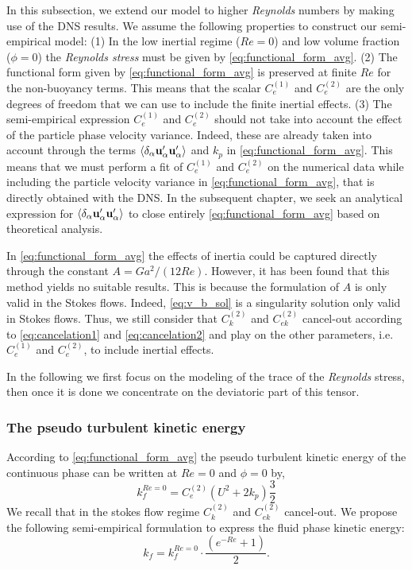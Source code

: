 In this subsection, we extend our model to higher \textit{Reynolds} numbers by making use of the DNS results. 
We assume the following properties to construct our semi-empirical model: 
(1) In the low inertial regime ($Re=0$) and low volume fraction ($\phi=0$) the \textit{Reynolds stress} must be given by  \ref{eq:functional_form_avg}. 
(2) The functional form given by \ref{eq:functional_form_avg} is preserved at finite $Re$ for the non-buoyancy terms. 
This means that the scalar $C_e^{(1)}$ and $C_e^{(2)}$ are the only degrees of freedom that we can use to include the finite inertial effects. 
(3) The semi-empirical expression  $C_e^{(1)}$ and $C_e^{(2)}$ should not take into account the effect of the particle phase velocity variance. 
Indeed, these are already taken into account through the terms $\left<\delta_\alpha \textbf{u}_\alpha'\textbf{u}_\alpha'\right>$ and $k_p$ in \ref{eq:functional_form_avg}. 
This means that we must perform a fit of $C_e^{(1)}$ and $C_e^{(2)}$ on the numerical data while including the particle velocity variance in \ref{eq:functional_form_avg}, that is directly obtained with the DNS.
In the subsequent chapter, we seek an analytical expression for $\left<\delta_\alpha \textbf{u}_\alpha'\textbf{u}_\alpha'\right>$ to close entirely \ref{eq:functional_form_avg} based on theoretical analysis.

In \ref{eq:functional_form_avg} the effects of inertia could be captured directly through the constant $A = Ga^2 /(12 Re)$. 
However, it has been found that this method yields no suitable results. 
This is because the formulation of $A$ is only valid in the Stokes flows. 
Indeed, \ref{eq:v_b_sol} is a singularity solution only valid in Stokes flows. 
Thus, we still consider that $C_k^{(2)}$ and $C_{ek}^{(2)}$ cancel-out according to \ref{eq:cancelation1} and \ref{eq:cancelation2} and play on the other parameters, i.e. $C_e^{(1)}$ and $C_e^{(2)}$,  to include inertial effects. 

In the following we first focus on the modeling of the trace of the \textit{Reynolds} stress, then once it is done we concentrate on the deviatoric part of this tensor. 

\subsubsection{The pseudo turbulent kinetic energy}

According to \ref{eq:functional_form_avg} the pseudo turbulent kinetic energy of the continuous phase can be written at $Re = 0$ and $\phi = 0$ by,
\begin{equation}
    k_f^{Re = 0}
    = 
    C_e^{(2)}  \left( U^2 + 2 k_p\right)  \frac{3}{2}
    \label{eq:TKE}
\end{equation}
We recall that in the stokes flow regime $C_k^{(2)}$ and $C_{ek}^{(2)}$ cancel-out. 
We propose the following semi-empirical formulation to express the fluid phase kinetic energy: 
\begin{equation}
    k_f
    = 
    k_f^{Re = 0}
    \cdot \frac{\left(e^{-Re} +1\right)}{2}.
    \label{eq:semi_empirical}
\end{equation}


